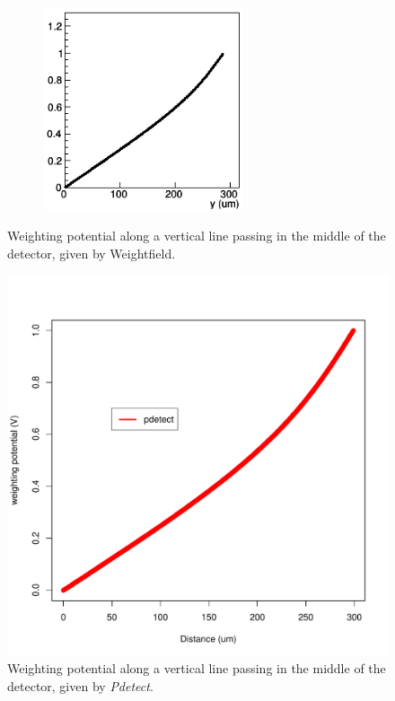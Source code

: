 \documentclass[11pt]{article}
\begin{document}
		\begin{figure}[H]
			\begin{minipage}[b]{.46\linewidth}
				\center
				\includegraphics[height=6cm, width=8cm]{images/boundary_conditions/weight_pot.png}
				\caption{Weighting potential along a vertical line passing in the middle of the detector,
						given by Weightfield.}
				\label{fig:weight_pot}
			\end{minipage} \hfill
			\begin{minipage}[b]{.46\linewidth}
			\center
				\includegraphics[scale=0.4]{images/boundary_conditions/free.pdf}
				\caption{Weighting potential along a vertical line passing in the middle of the detector,
						given by \textit{Pdetect}.}
				\label{fig:free_conditions}
				\end{minipage}
		\end{figure}
\end{document}
